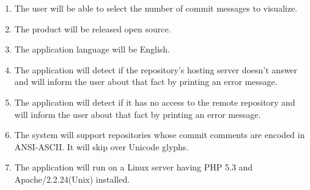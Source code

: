 \documentclass[12pt]{scrartcl}
\begin{document}
\begin{enumerate}
\item The user will be able to select the number of commit messages to visualize. 
\item The product will be released open source.
\item The application language will be English.
\item The application will detect if the repository's hosting server doesn't answer and will inform the user about that fact by printing an error message.
\item The application will detect if it has no access to the remote repository and will inform the user about that fact by printing an error message.
\item The system will support repositories whose commit comments are encoded in
	ANSI-ASCII. It will skip over Unicode glyphs.
\item The application will run on a Linux server having PHP 5.3 and Apache/2.2.24(Unix) installed.
\end{enumerate}
\end{document}

